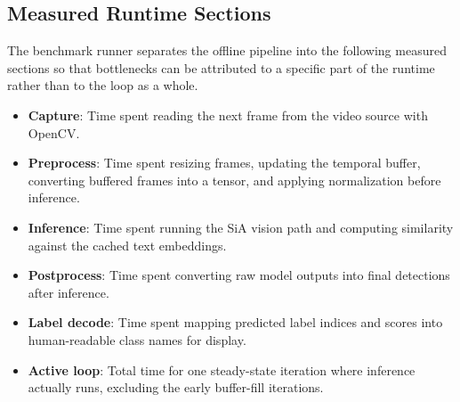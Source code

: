 \documentclass[11pt]{article}
\begin{document}
\subsection*{Measured Runtime Sections}


The benchmark runner separates the offline pipeline into the following measured sections so that bottlenecks can be attributed to a specific part of the runtime rather than to the loop as a whole.

\begin{itemize}
\item \textbf{Capture}: Time spent reading the next frame from the video source with OpenCV.
\item \textbf{Preprocess}: Time spent resizing frames, updating the temporal buffer, converting buffered frames into a tensor, and applying normalization before inference.
\item \textbf{Inference}: Time spent running the SiA vision path and computing similarity against the cached text embeddings.
\item \textbf{Postprocess}: Time spent converting raw model outputs into final detections after inference.
\item \textbf{Label decode}: Time spent mapping predicted label indices and scores into human-readable class names for display.
\item \textbf{Active loop}: Total time for one steady-state iteration where inference actually runs, excluding the early buffer-fill iterations.
\end{itemize}
\end{document}
